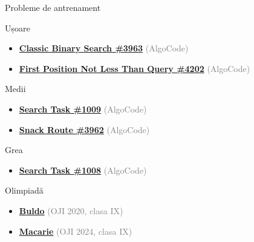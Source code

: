 \documentclass{beamer}
\begin{document}
\begin{frame}{Probleme de antrenament}
  \begin{block}{Ușoare}
    \begin{itemize}\footnotesize\itemsep0pt
      \item \href{https://code.algolymp.com/problems/3963}{\textbf{Classic Binary Search \#3963}} {\footnotesize\textcolor{gray}{(AlgoCode)}}
      \item \href{https://code.algolymp.com/problems/4202}{\textbf{First Position Not Less Than Query \#4202}} {\footnotesize\textcolor{gray}{(AlgoCode)}}
    \end{itemize}
  \end{block}
  \vspace{-4pt}
  \begin{block}{Medii}
    \begin{itemize}\footnotesize\itemsep0pt
      \item \href{https://code.algolymp.com/problems/1009}{\textbf{Search Task \#1009}} {\footnotesize\textcolor{gray}{(AlgoCode)}}
      \item \href{https://code.algolymp.com/problems/3962}{\textbf{Snack Route \#3962}} {\footnotesize\textcolor{gray}{(AlgoCode)}}
    \end{itemize}
  \end{block}
  \vspace{-4pt}
  \begin{block}{Grea}
    \begin{itemize}\footnotesize\itemsep0pt
      \item \href{https://code.algolymp.com/problems/1008}{\textbf{Search Task \#1008}} {\footnotesize\textcolor{gray}{(AlgoCode)}}
    \end{itemize}
  \end{block}
  \vspace{-4pt}
  \begin{block}{Olimpiadă}
    \begin{itemize}\footnotesize\itemsep0pt
      \item \href{https://code.algolymp.com/problems/1916}{\textbf{Buldo}} {\footnotesize\textcolor{gray}{(OJI 2020, clasa IX)}}
      \item \href{https://code.algolymp.com/problems/2984}{\textbf{Macarie}} {\footnotesize\textcolor{gray}{(OJI 2024, clasa IX)}}
    \end{itemize}
  \end{block}
\end{frame}
\end{document}
